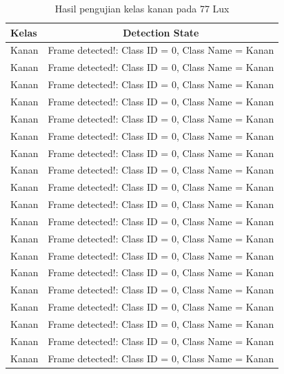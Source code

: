 \begin{longtable}{|l|c|}
  \caption{Hasil pengujian kelas kanan pada 77 Lux}
  \label{tb:lux77kanan} \\
  \hline
  \rowcolor[HTML]{C0C0C0} 
  \textbf{Kelas} & \textbf{Detection State}                           \\ \hline
  Kanan          & Frame detected!: Class ID = 0, Class Name = Kanan \\ \hline
  Kanan          & Frame detected!: Class ID = 0, Class Name = Kanan \\ \hline
  Kanan          & Frame detected!: Class ID = 0, Class Name = Kanan \\ \hline
  Kanan          & Frame detected!: Class ID = 0, Class Name = Kanan \\ \hline
  Kanan          & Frame detected!: Class ID = 0, Class Name = Kanan \\ \hline
  Kanan          & Frame detected!: Class ID = 0, Class Name = Kanan \\ \hline
  Kanan          & Frame detected!: Class ID = 0, Class Name = Kanan \\ \hline
  Kanan          & Frame detected!: Class ID = 0, Class Name = Kanan \\ \hline
  Kanan          & Frame detected!: Class ID = 0, Class Name = Kanan \\ \hline
  Kanan          & Frame detected!: Class ID = 0, Class Name = Kanan \\ \hline
  Kanan          & Frame detected!: Class ID = 0, Class Name = Kanan \\ \hline
  Kanan          & Frame detected!: Class ID = 0, Class Name = Kanan \\ \hline
  Kanan          & Frame detected!: Class ID = 0, Class Name = Kanan \\ \hline
  Kanan          & Frame detected!: Class ID = 0, Class Name = Kanan \\ \hline
  Kanan          & Frame detected!: Class ID = 0, Class Name = Kanan \\ \hline
  Kanan          & Frame detected!: Class ID = 0, Class Name = Kanan \\ \hline
  Kanan          & Frame detected!: Class ID = 0, Class Name = Kanan \\ \hline
  Kanan          & Frame detected!: Class ID = 0, Class Name = Kanan \\ \hline
  Kanan          & Frame detected!: Class ID = 0, Class Name = Kanan \\ \hline

\end{longtable}

